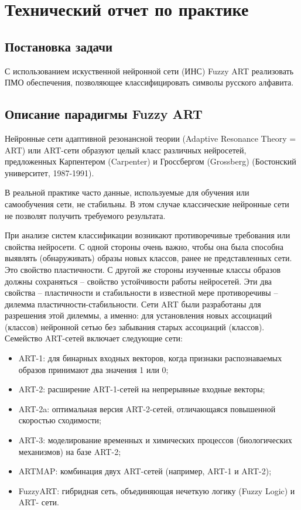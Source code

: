 \newpage
\section{Технический отчет по практике}

\subsection{Постановка задачи}

С использованием искуственной нейронной сети (ИНС) Fuzzy ART реализовать ПМО обеспечения, позволяющее классифицировать символы русского алфавита.

\subsection{Описание парадигмы Fuzzy ART}


Нейронные сети адаптивной резонансной теории (Adaptive Resonance Theory = ART) или ART-сети образуют целый класс различных нейросетей, предложенных Карпентером (Carpenter) и Гроссбергом (Grossberg) (Бостонский университет, 1987-1991).

В реальной практике часто данные, используемые для обучения или самообучения сети, не стабильны. В этом случае классические нейронные сети не позволят получить требуемого результата.

При анализе систем классификации возникают противоречивые требования или свойства нейросети. С одной стороны очень важно, чтобы она была способна выявлять (обнаруживать) образы новых классов, ранее не представленных сети. Это свойство пластичности. С другой же стороны изученные классы образов должны сохраняться – свойство устойчивости работы нейросетей. Эти два свойства – пластичности и стабильности в известной мере противоречивы – дилемма пластичности-стабильности. Сети ART были разработаны для разрешения этой дилеммы, а именно: для установления новых ассоциаций (классов) нейронной сетью без забывания старых ассоциаций (классов). Семейство ART-сетей включает следующие сети:
\begin{itemize} \compact
	\item ART-1: для бинарных входных векторов, когда признаки распознаваемых образов принимают два значения 1 или 0;
	\item ART-2: расширение ART-1-сетей на непрерывные входные векторы;
	\item ART-2a: оптимальная версия ART-2-сетей, отличающаяся повышенной скоростью сходимости;
	\item ART-3: моделирование временных и химических процессов (биологических механизмов) на базе ART-2;
	\item ARTMAP: комбинация двух ART-сетей (например, ART-1 и ART-2);
	\item FuzzyART: гибридная сеть, объединяющая нечеткую логику (Fuzzy Logic) и ART- сети.
\end{itemize}


